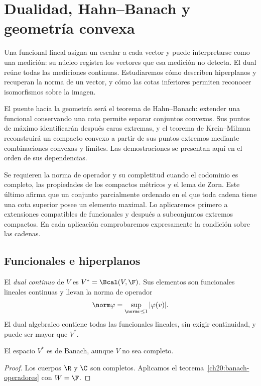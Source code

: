 \chapter{Dualidad, Hahn--Banach y geometría convexa}\label{cap:nuevo10}\label{chap:21}\label{chap:24}

Una funcional lineal asigna un escalar a cada vector y puede interpretarse como una medición: su núcleo registra los vectores que esa medición no detecta. El dual reúne todas las mediciones continuas. Estudiaremos cómo describen hiperplanos y recuperan la norma de un vector, y cómo las cotas inferiores permiten reconocer isomorfismos sobre la imagen.

El puente hacia la geometría será el teorema de Hahn--Banach: extender una funcional conservando una cota permite separar conjuntos convexos. Sus puntos de máximo identificarán después caras extremas, y el teorema de Krein--Milman reconstruirá un compacto convexo a partir de sus puntos extremos mediante combinaciones convexas y límites. Las demostraciones se presentan aquí en el orden de sus dependencias.

Se requieren la norma de operador y su completitud cuando el codominio es completo, las propiedades de los compactos métricos y el lema de Zorn. Este último afirma que un conjunto parcialmente ordenado en el que toda cadena tiene una cota superior posee un elemento maximal. Lo aplicaremos primero a extensiones compatibles de funcionales y después a subconjuntos extremos compactos. En cada aplicación comprobaremos expresamente la condición sobre las cadenas.

\section{Funcionales e hiperplanos}\label{lectura:21}

\begin{definicion}
El \emph{dual continuo} de $V$ es $V^*=\Bcal(V,\F)$. Sus elementos son funcionales lineales continuas y llevan la norma de operador
\[\norm\varphi=\sup_{\norm v\leq1}|\varphi(v)|.\]
El dual algebraico contiene todas las funcionales lineales, sin exigir continuidad, y puede ser mayor que $V^*$.
\end{definicion}

\begin{proposicion}
El espacio $V^*$ es de Banach, aunque $V$ no sea completo.
\end{proposicion}
\begin{proof}
Los cuerpos $\R$ y $\C$ son completos. Aplicamos el teorema~\ref{ch20:banach-operadores} con $W=\F$.
\end{proof}

